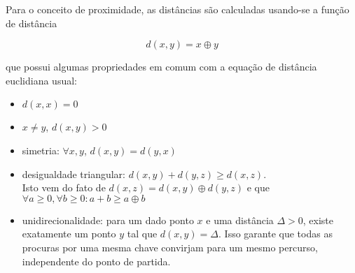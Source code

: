 Para o conceito de proximidade, as distâncias são calculadas usando-se a função de
distância

\begin{equation}
    d(x,y) = x \oplus y
\end{equation}

que possui algumas propriedades em comum com a equação de distância euclidiana usual:

\begin{itemize}
    \item $d(x,x) = 0$
    \item $x \neq y$, $d(x,y) > 0$
    \item simetria: $\forall x,y$, $d(x,y) = d(y,x)$
    \item desigualdade triangular: $d(x,y) + d(y,z) \geq d(x,z)$. \\
        Isto vem do fato de $d(x,z) = d(x,y) \oplus d(y,z)$ e que $\forall a \geq 0,
        \forall b \geq 0 : a + b \geq a \oplus b$
    \item unidirecionalidade: para um dado ponto $x$ e uma distância $\Delta > 0$,
        existe exatamente um ponto $y$ tal que $d(x,y) = \Delta$. Isso garante que todas
        as procuras por uma mesma chave convirjam para um mesmo percurso, independente
        do ponto de partida.
\end{itemize}